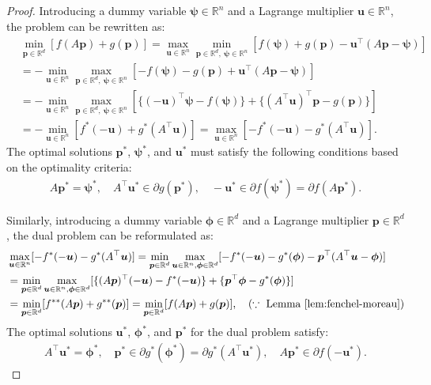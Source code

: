 \begin{proof}
Introducing a dummy variable $\bm\psi\in\mathbb{R}^n$ and a Lagrange multiplier $\bm u\in\mathbb{R}^n$, the problem can be rewritten as:
\begin{align}
& \min_{\bm p\in\mathbb{R}^d} [f(A\bm p) + g(\bm p)]
	= \max_{\bm u\in\mathbb{R}^n} \min_{\bm p\in\mathbb{R}^d,~\bm\psi\in\mathbb{R}^n} [f(\bm\psi) + g(\bm p) - \bm u^\top(A\bm p - \bm\psi)] \label{eq:Fenchel-Lagrange}\\
& = -\min_{\bm u\in\mathbb{R}^n} \max_{\bm p\in\mathbb{R}^d,~\bm\psi\in\mathbb{R}^n} [-f(\bm\psi) - g(\bm p) + \bm u^\top(A\bm p - \bm\psi)] \nonumber\\
& = -\min_{\bm u\in\mathbb{R}^n} \max_{\bm p\in\mathbb{R}^d,~\bm\psi\in\mathbb{R}^n} [\{(-\bm u)^\top \bm\psi - f(\bm\psi)\} + \{(A^\top \bm u)^\top \bm p - g(\bm p)\}] \nonumber\\
& = -\min_{\bm u\in\mathbb{R}^n} [f^*(-\bm u) + g^*(A^\top \bm u)]
	= \max_{\bm u\in\mathbb{R}^n} [-f^*(-\bm u) - g^*(A^\top \bm u)]. \label{eq:Fenchel-dual}
\end{align}
The optimal solutions $\bm p^*$, $\bm\psi^*$, and $\bm u^*$ must satisfy the following conditions based on the optimality criteria:
\begin{align*}
A \bm p^* = \bm\psi^*,
\quad
A^\top \bm u^* \in \partial g(\bm p^*),
\quad
-\bm u^* \in \partial f(\bm\psi^*) = \partial f(A \bm p^*).
\end{align*}

Similarly, introducing a dummy variable $\bm\phi\in\mathbb{R}^d$ and a Lagrange multiplier $\bm p\in\mathbb{R}^d$, the dual problem can be reformulated as:
\begin{align}
& \max_{\bm u\in\mathbb{R}^n} [-f^*(-\bm u) - g^*(A^\top \bm u)]
	= \min_{\bm p\in\mathbb{R}^d} \max_{\bm u\in\mathbb{R}^n, \bm\phi\in\mathbb{R}^d} [-f^*(-\bm u) - g^*(\bm\phi) - \bm p^\top(A^\top \bm u - \bm\phi)] \label{eq:Fenchel-dual-Lagrange}\\
& = \min_{\bm p\in\mathbb{R}^d} \max_{\bm u\in\mathbb{R}^n, \bm\phi\in\mathbb{R}^d} [\{(A\bm p)^\top(-\bm u) - f^*(-\bm u)\} + \{\bm p^\top \bm\phi - g^*(\bm\phi)\}] \nonumber\\
& = \min_{\bm p\in\mathbb{R}^d} [f^{**}(A\bm p) + g^{**}(\bm p)]
	= \min_{\bm p\in\mathbb{R}^d} [f(A\bm p) + g(\bm p)], \quad (\because~\text{Lemma \ref{lem:fenchel-moreau}}) \nonumber
\end{align}
The optimal solutions $\bm u^*$, $\bm\phi^*$, and $\bm p^*$ for the dual problem satisfy:
\begin{align*}
A^\top \bm u^* = \bm\phi^*,
\quad
\bm p^* \in \partial g^*(\bm\phi^*) = \partial g^*(A^\top \bm u^*),
\quad
A \bm p^* \in \partial f(-\bm u^*).
\end{align*}
\end{proof}


